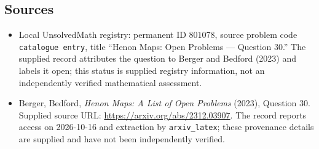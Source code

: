 \documentclass[11pt]{article}
\begin{document}
\subsection{Sources}
\begin{itemize}
\item Local UnsolvedMath registry: permanent ID \(801078\), source problem code \texttt{catalogue entry}, title ``Henon Maps: Open Problems --- Question 30.'' The supplied record attributes the question to Berger and Bedford (2023) and labels it open; this status is supplied registry information, not an independently verified mathematical assessment.
\item Berger, Bedford, \emph{Henon Maps: A List of Open Problems} (2023), Question 30. Supplied source URL: \url{https://arxiv.org/abs/2312.03907}. The record reports access on 2026-10-16 and extraction by \texttt{arxiv\_latex}; these provenance details are supplied and have not been independently verified.
\end{itemize}
\end{document}

